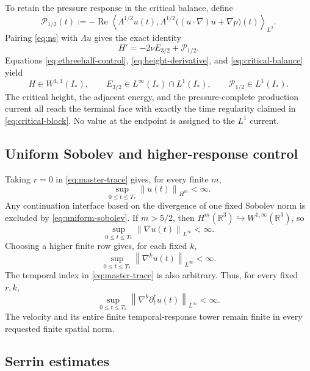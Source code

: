 \documentclass[11pt,letterpaper]{article}
\theoremstyle{definition}
\theoremstyle{remark}
\newcommand{\R}{\mathbb R}
\newcommand{\norm}[1]{\left\lVert #1\right\rVert}
\newcommand{\Istar}{I_*}
\newcommand{\pair}[2]{\left\langle #1,#2\right\rangle}
\begin{document}
To retain the pressure response in the critical balance, define
\[
\mathcal P_{1/2}(t)
:=-\operatorname{Re}
\pair{\Lambda^{1/2}u(t)}
{\Lambda^{1/2}\bigl((u\cdot\nabla)u+\nabla p\bigr)(t)}_{L^2}.
\]
Pairing \eqref{eq:ns} with \(\Lambda u\) gives the exact identity
\begin{equation}
H'=-2\nu E_{3/2}+\mathcal P_{1/2}.
\label{eq:critical-balance}
\end{equation}
Equations \eqref{eq:ethreehalf-control},
\eqref{eq:height-derivative}, and \eqref{eq:critical-balance} yield
\begin{equation}
\boxed{
H\in W^{1,1}(\Istar),\qquad
E_{3/2}\in L^\infty(\Istar)\cap L^1(\Istar),\qquad
\mathcal P_{1/2}\in L^1(\Istar).}
\label{eq:critical-block}
\end{equation}
The critical height, the adjacent energy, and the pressure-complete
production current all reach the terminal face with exactly the time
regularity claimed in \eqref{eq:critical-block}.  No value at the endpoint
is assigned to the \(L^1\) current.

\subsection{Uniform Sobolev and higher-response control}

Taking \(r=0\) in \eqref{eq:master-trace} gives, for every finite \(m\),
\begin{equation}
\sup_{0\le t\le T_*}\norm{u(t)}_{H^m}<\infty.
\label{eq:uniform-sobolev}
\end{equation}
Any continuation interface based on the divergence of one fixed Sobolev norm
is excluded by \eqref{eq:uniform-sobolev}.  If \(m>5/2\), then
\(H^m(\R^3)\hookrightarrow W^{1,\infty}(\R^3)\), so
\[
\sup_{0\le t\le T_*}\norm{\nabla u(t)}_{L^\infty}<\infty.
\]
Choosing a higher finite row gives, for each fixed \(k\),
\[
\sup_{0\le t\le T_*}\norm{\nabla^k u(t)}_{L^\infty}<\infty.
\]
The temporal index in \eqref{eq:master-trace} is also arbitrary.  Thus, for
every fixed \(r,k\),
\begin{equation}
\sup_{0\le t\le T_*}
\norm{\nabla^k\partial_t^r u(t)}_{L^\infty}<\infty.
\label{eq:all-fixed-responses}
\end{equation}
The velocity and its entire finite temporal-response tower remain finite in
every requested finite spatial norm.

\subsection{Serrin estimates}
\end{document}
